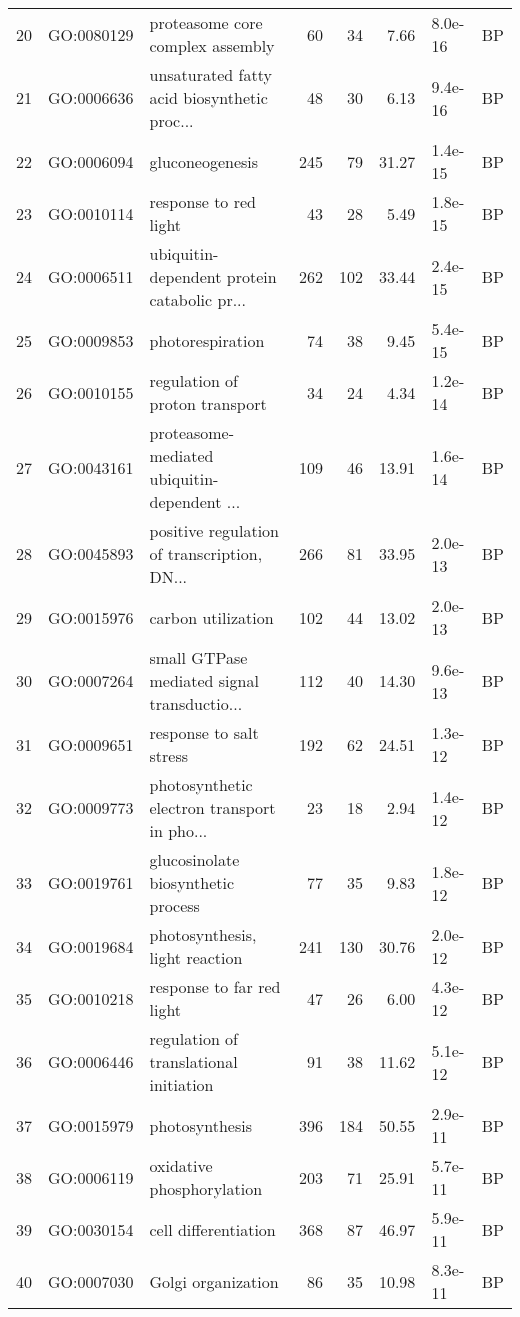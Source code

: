 \documentclass[12pt,oneside,a4paper]{article}
\begin{document}
\begin{longtable}{rllrrrll}
  20 & GO:0080129 & proteasome core complex assembly &  60 &  34 & 7.66 & 8.0e-16 & BP \\ 
  21 & GO:0006636 & unsaturated fatty acid biosynthetic proc... &  48 &  30 & 6.13 & 9.4e-16 & BP \\ 
  22 & GO:0006094 & gluconeogenesis & 245 &  79 & 31.27 & 1.4e-15 & BP \\ 
  23 & GO:0010114 & response to red light &  43 &  28 & 5.49 & 1.8e-15 & BP \\ 
  24 & GO:0006511 & ubiquitin-dependent protein catabolic pr... & 262 & 102 & 33.44 & 2.4e-15 & BP \\ 
  25 & GO:0009853 & photorespiration &  74 &  38 & 9.45 & 5.4e-15 & BP \\ 
  26 & GO:0010155 & regulation of proton transport &  34 &  24 & 4.34 & 1.2e-14 & BP \\ 
  27 & GO:0043161 & proteasome-mediated ubiquitin-dependent ... & 109 &  46 & 13.91 & 1.6e-14 & BP \\ 
  28 & GO:0045893 & positive regulation of transcription, DN... & 266 &  81 & 33.95 & 2.0e-13 & BP \\ 
  29 & GO:0015976 & carbon utilization & 102 &  44 & 13.02 & 2.0e-13 & BP \\ 
  30 & GO:0007264 & small GTPase mediated signal transductio... & 112 &  40 & 14.30 & 9.6e-13 & BP \\ 
  31 & GO:0009651 & response to salt stress & 192 &  62 & 24.51 & 1.3e-12 & BP \\ 
  32 & GO:0009773 & photosynthetic electron transport in pho... &  23 &  18 & 2.94 & 1.4e-12 & BP \\ 
  33 & GO:0019761 & glucosinolate biosynthetic process &  77 &  35 & 9.83 & 1.8e-12 & BP \\ 
  34 & GO:0019684 & photosynthesis, light reaction & 241 & 130 & 30.76 & 2.0e-12 & BP \\ 
  35 & GO:0010218 & response to far red light &  47 &  26 & 6.00 & 4.3e-12 & BP \\ 
  36 & GO:0006446 & regulation of translational initiation &  91 &  38 & 11.62 & 5.1e-12 & BP \\ 
  37 & GO:0015979 & photosynthesis & 396 & 184 & 50.55 & 2.9e-11 & BP \\ 
  38 & GO:0006119 & oxidative phosphorylation & 203 &  71 & 25.91 & 5.7e-11 & BP \\ 
  39 & GO:0030154 & cell differentiation & 368 &  87 & 46.97 & 5.9e-11 & BP \\ 
  40 & GO:0007030 & Golgi organization &  86 &  35 & 10.98 & 8.3e-11 & BP \\ 

\end{longtable}
\end{document}
